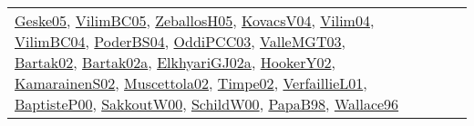 {\begin{longtable}{lp{3cm}>{\raggedright}p{6cm}>{\raggedright}p{6cm}p{8cm}}
\href{papers/Geske05.pdf}{Geske05}\cite{Geske05}, \href{articles/VilimBC05.pdf}{VilimBC05}\cite{VilimBC05}, \href{articles/ZeballosH05.pdf}{ZeballosH05}\cite{ZeballosH05}, \href{papers/KovacsV04.pdf}{KovacsV04}\cite{KovacsV04}, \href{papers/Vilim04.pdf}{Vilim04}\cite{Vilim04}, \href{papers/VilimBC04.pdf}{VilimBC04}\cite{VilimBC04}, \href{articles/PoderBS04.pdf}{PoderBS04}\cite{PoderBS04}, \href{papers/OddiPCC03.pdf}{OddiPCC03}\cite{OddiPCC03}, \href{papers/ValleMGT03.pdf}{ValleMGT03}\cite{ValleMGT03}, \href{papers/Bartak02.pdf}{Bartak02}\cite{Bartak02}, \href{papers/Bartak02a.pdf}{Bartak02a}\cite{Bartak02a}, \href{papers/ElkhyariGJ02a.pdf}{ElkhyariGJ02a}\cite{ElkhyariGJ02a}, \href{papers/HookerY02.pdf}{HookerY02}\cite{HookerY02}, \href{papers/KamarainenS02.pdf}{KamarainenS02}\cite{KamarainenS02}, \href{papers/Muscettola02.pdf}{Muscettola02}\cite{Muscettola02}, \href{articles/Timpe02.pdf}{Timpe02}\cite{Timpe02}, \href{papers/VerfaillieL01.pdf}{VerfaillieL01}\cite{VerfaillieL01}, \href{articles/BaptisteP00.pdf}{BaptisteP00}\cite{BaptisteP00}, \href{articles/SakkoutW00.pdf}{SakkoutW00}\cite{SakkoutW00}, \href{articles/SchildW00.pdf}{SchildW00}\cite{SchildW00}, \href{articles/PapaB98.pdf}{PapaB98}\cite{PapaB98}, \href{articles/Wallace96.pdf}{Wallace96}\cite{Wallace96}\\

\end{longtable}}
